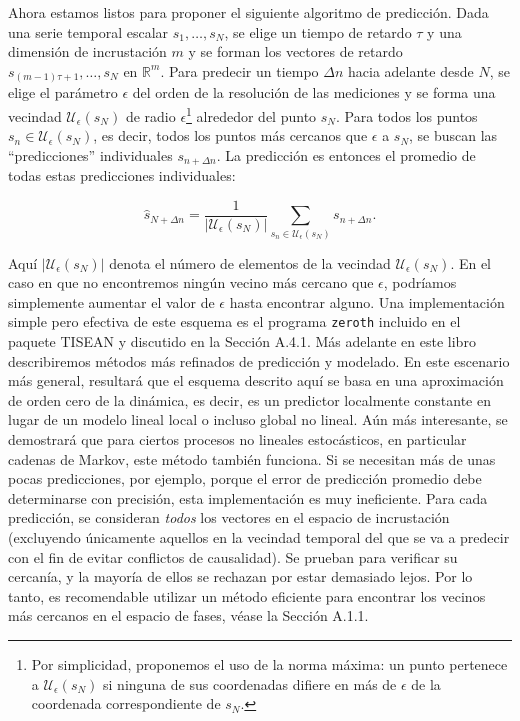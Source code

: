 \documentclass[10pt,a4paper]{book}
\begin{document}
\bigskip

Ahora estamos listos para proponer el siguiente algoritmo de predicción. Dada una serie temporal escalar $s_1, \ldots, s_N$, se elige un tiempo de retardo $\tau$ y una dimensión de incrustación $m$ y se forman los vectores de retardo $s_{(m-1)\tau+1}, \ldots, s_N$ en $\mathbb{R}^m$. Para predecir un tiempo $\Delta n$ hacia adelante desde $N$, se elige el parámetro $\epsilon$ del orden de la resolución de las mediciones y se forma una vecindad $\mathcal{U}_\epsilon(s_N)$ de radio $\epsilon$\footnote{Por simplicidad, proponemos el uso de la norma máxima: un punto pertenece a 
\(\mathcal{U}_{\epsilon}(s_{N})\) si ninguna de sus coordenadas difiere en más de 
\(\epsilon\) de la coordenada correspondiente de \(s_{N}\).
} alrededor del punto $s_N$. Para todos los puntos $s_n \in \mathcal{U}_\epsilon(s_N)$, es decir, todos los puntos más cercanos que $\epsilon$ a $s_N$, se buscan las “predicciones” individuales $s_{n+\Delta n}$. La predicción es entonces el promedio de todas estas predicciones individuales:

\[
\hat{s}_{N+\Delta n} = \frac{1}{|\mathcal{U}_\epsilon(s_N)|} \sum_{s_n \in \mathcal{U}_\epsilon(s_N)} s_{n+\Delta n}.
\tag{4.7}
\]

Aquí $|\mathcal{U}_\epsilon(s_N)|$ denota el número de elementos de la vecindad $\mathcal{U}_\epsilon(s_N)$. En el caso en que no encontremos ningún vecino más cercano que $\epsilon$, podríamos simplemente aumentar el valor de $\epsilon$ hasta encontrar alguno. Una implementación simple pero efectiva de este esquema es el programa \texttt{zeroth} incluido en el paquete TISEAN y discutido en la Sección A.4.1. Más adelante en este libro describiremos métodos más refinados de predicción y modelado. En este escenario más general, resultará que el esquema descrito aquí se basa en una aproximación de orden cero de la dinámica, es decir, es un predictor localmente constante en lugar de un modelo lineal local o incluso global no lineal. Aún más interesante, se demostrará que para ciertos procesos no lineales estocásticos, en particular cadenas de Markov, este método también funciona. Si se necesitan más de unas pocas predicciones, por ejemplo, porque el error de predicción promedio debe determinarse con precisión, esta implementación es muy ineficiente. Para cada predicción, se consideran \textit{todos} los vectores en el espacio de incrustación (excluyendo únicamente aquellos en la vecindad temporal del que se va a predecir con el fin de evitar conflictos de causalidad). Se prueban para verificar su cercanía, y la mayoría de ellos se rechazan por estar demasiado lejos. Por lo tanto, es recomendable utilizar un método eficiente para encontrar los vecinos más cercanos en el espacio de fases, véase la Sección A.1.1.
\end{document}
